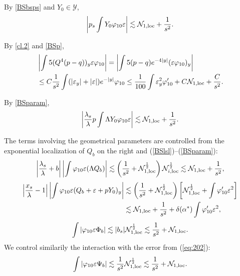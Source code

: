 \documentclass[11pt,a4paper,reqno]{amsart}
\theoremstyle{remark}
\numberwithin{equation}{section}
\def\fref#1{{\rm (\ref{#1})}}
\def\e{\varepsilon}
\def\fref#1{{\rm (\ref{#1})}}
\def\lsl{\frac{\lambda_s}{\lambda}}
\def\lsl{\frac{\lambda_s}{\lambda}}
\def\xsl{\frac{x_s}{\lambda}}
\def\Yz{Y_0}
\begin{document}
By \eqref{BSbsps} and $\Yz \in \mathcal{Y}$,
$$
\left| p_s  \int \Yz \varphi_{10} \e\right| \lesssim 
\mathcal N_{1,\rm loc} +\frac 1{s^2}.
$$

By \eqref{cl.2} and \eqref{BSp},
\begin{align*}
& \left| \int 5 (Q^4 (p-q))_y  \e \varphi_{10}\right|
=\left| \int 5 (p-q) e^{-4 |y|} (\e \varphi_{10})_y \right|
\\ &\leq C \frac 1{s^2}  \int (|\e_y|+|\e|) e^{-|y|}\varphi_{10}
\leq \frac 1{100} \int \e_y^2  \varphi'_{10} + C \mathcal N_{1,\rm loc} +\frac C{s^2}.
\end{align*}

By \eqref{BSparam},
$$
\left|\lsl p  \int \Lambda \Yz \varphi_{10} \e\right|
\lesssim \mathcal N_{1,\rm loc} +\frac 1{s^2}.
$$

The terms involving the geometrical parameters are controlled from the exponential localization of $Q_b$ on the right and \fref{BSlsl}--\fref{BSparam}:
$$\left|\lsl+b\right|\left|\int\varphi_{10}\e(\Lambda Q_b)\right|\lesssim \left(\frac 1{s^2} +\mathcal N_{1,\rm loc}^{\frac12}\right)\mathcal N_{i,\rm loc}^{\frac12}\lesssim \mathcal N_{1,\rm loc}+\frac 1{s^2},$$
\begin{align*}\left|\xsl-1\right|\left|\int\varphi_{10}\e(Q_b+\e+p\Yz)_y\right|&\lesssim \left(\frac 1{s^2}+\mathcal N_{1,\rm loc}^{\frac12}\right)\left[\mathcal N_{1,\rm loc}^{\frac12}+\int\varphi_{10}'\e^2\right]\\ &\lesssim \mathcal N_{1,\rm loc}+\frac 1{s^2}+\delta(\alpha^*) \int\varphi_{10}'\e^2,\end{align*}
$$\int\left|\varphi_{10}\e\Phi_b\right|\lesssim |b_s| \mathcal N_{1,\rm loc}^{\frac 12}\lesssim \frac 1{s^2} +\mathcal N_{1,\rm loc}.$$
We control similarily the interaction with the error from \fref{eq:202}: $$\int\left|\varphi_{10}\e\Psi_b\right|\lesssim \frac 1{s^2} \mathcal N_{1,\rm loc}^{\frac 12}\lesssim \frac 1{s^2}+\mathcal N_{1,\rm loc}.$$
\end{document}
